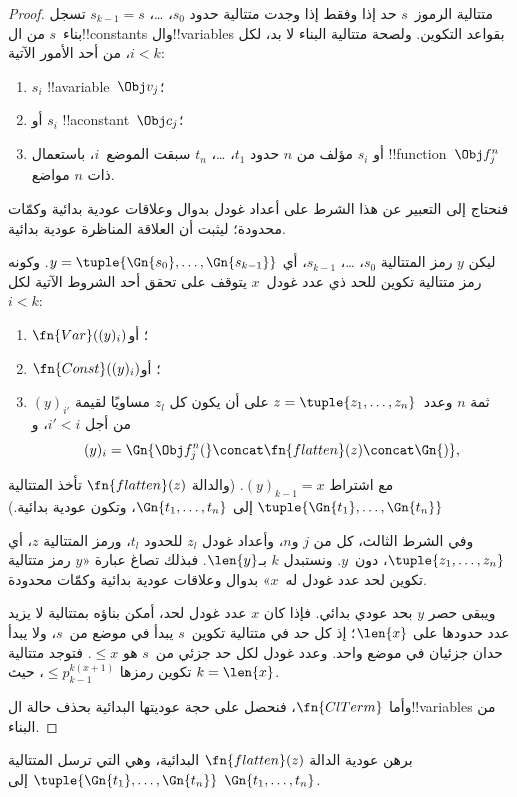 \documentclass[../../../include/open-logic-section]{subfiles}
\begin{document}
\begin{proof}
متتالية الرموز~$s$ حد إذا وفقط إذا وجدت
متتالية حدود $s_0$، \dots، $s_{k-1}=s$
تسجل بناء~$s$ من ال!!{constant}s
وال!!{variable}s بقواعد التكوين.
ولصحة متتالية البناء لا بد، لكل $i<k$،
من أحد الأمور الآتية:
\begin{enumerate}
\item $s_i$ !!a{variable}~$\Obj v_j$؛
\item أو $s_i$ !!a{constant}~$\Obj c_j$؛
\item أو $s_i$ مؤلف من $n$ حدود
  $t_1$، \dots، $t_n$ سبقت الموضع~$i$،
  باستعمال !!{function}~$\Obj f^n_j$ ذات $n$ مواضع.
\end{enumerate}
فنحتاج إلى التعبير عن هذا الشرط على أعداد غودل
بدوال وعلاقات عودية بدائية وكمّات محدودة؛
ليثبت أن العلاقة المناظرة عودية بدائية.

ليكن $y$ رمز المتتالية $s_0$، \dots، $s_{k-1}$،
أي $y=\tuple{\Gn{s_0}, \dots, \Gn{s_{k-1}}}$.
وكونه رمز متتالية تكوين للحد ذي عدد غودل~$x$
يتوقف على تحقق أحد الشروط الآتية لكل $i<k$:
\begin{enumerate}
\item $\fn{Var}((y)_i)$؛ أو
\item $\fn{Const}((y)_i)$؛ أو
\item ثمة $n$ وعدد~$z=\tuple{z_1, \dots, z_n}$ على أن يكون كل $z_l$
  مساويًا لقيمة $(y)_{i'}$ من أجل $i'<i$، و
\[
(y)_i = \Gn{\Obj f^n_j(} \concat \fn{flatten}(z) \concat \Gn{)},
\]
\end{enumerate}
مع اشتراط $(y)_{k-1}=x$. (والدالة $\fn{flatten}(z)$ تأخذ المتتالية
$\tuple{\Gn{t_1}, \dots, \Gn{t_n}}$ إلى $\Gn{t_1, \dots, t_n}$، وتكون
عودية بدائية.)

وفي الشرط الثالث، كل من $j$ و$n$، وأعداد
غودل $z_l$ للحدود $t_l$، ورمز المتتالية
$z$، أي $\tuple{z_1, \dots, z_n}$،
دون~$y$. ونستبدل $k$ بـ$\len{y}$.
فبذلك تصاغ عبارة «$y$ رمز متتالية تكوين
لحد عدد غودل له~$x$» بدوال وعلاقات
عودية بدائية وكمّات محدودة.

ويبقى حصر $y$ بحد عودي بدائي. فإذا كان
$x$ عدد غودل لحد، أمكن بناؤه بمتتالية
لا يزيد عدد حدودها على $\len{x}$؛
إذ كل حد في متتالية تكوين~$s$ يبدأ
في موضع من~$s$، ولا يبدأ حدان جزئيان
في موضع واحد. وعدد غودل لكل حد جزئي
من~$s$ هو $ \le x$. فتوجد متتالية
تكوين رمزها $\le p_{k-1}^{k(x+1)}$،
حيث $k=\len{x}$.

وأما $\fn{ClTerm}$، فنحصل على حجة عوديتها
البدائية بحذف حالة ال!!{variable}s من البناء.
\end{proof}

\begin{prob}
برهن عودية الدالة $\fn{flatten}(z)$ البدائية، وهي التي ترسل المتتالية
$\tuple{\Gn{t_1}, \dots, \Gn{t_n}}$ إلى $\Gn{t_1, \dots, t_n}$.
\end{prob}
\end{document}
